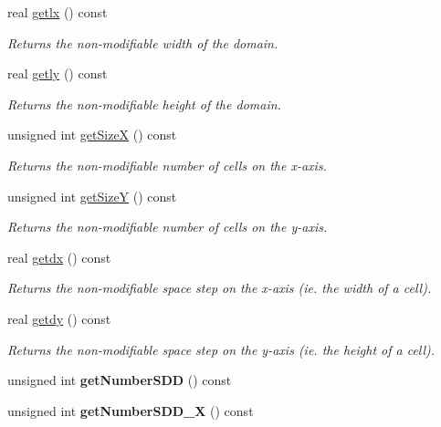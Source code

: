 \begin{DoxyCompactItemize}
real \hyperlink{classDomain_a510afad91fe81eb2ccef203a980f4223}{getlx} () const
\begin{DoxyCompactList}\small\item\em Returns the non-\/modifiable width of the domain. \end{DoxyCompactList}\item 
real \hyperlink{classDomain_ac9cedab179bb0611fc0e9fcfbcedb835}{getly} () const
\begin{DoxyCompactList}\small\item\em Returns the non-\/modifiable height of the domain. \end{DoxyCompactList}\item 
unsigned int \hyperlink{classDomain_a75f299e3871fe9cec01637b140429ef9}{get\+SizeX} () const
\begin{DoxyCompactList}\small\item\em Returns the non-\/modifiable number of cells on the x-\/axis. \end{DoxyCompactList}\item 
unsigned int \hyperlink{classDomain_a66692b4f23353c9b1fe884e583770cb3}{get\+SizeY} () const
\begin{DoxyCompactList}\small\item\em Returns the non-\/modifiable number of cells on the y-\/axis. \end{DoxyCompactList}\item 
real \hyperlink{classDomain_acdb586f6ef994a1621680ec9b946aeb4}{getdx} () const
\begin{DoxyCompactList}\small\item\em Returns the non-\/modifiable space step on the x-\/axis (ie. the width of a cell). \end{DoxyCompactList}\item 
real \hyperlink{classDomain_a5e62ab8a8b53f67cc3c30b6066b10aac}{getdy} () const
\begin{DoxyCompactList}\small\item\em Returns the non-\/modifiable space step on the y-\/axis (ie. the height of a cell). \end{DoxyCompactList}\item 
\mbox{\label{classDomain_a978917d5bf263dd1345f1a41c9edf661}} 
unsigned int {\bfseries get\+Number\+S\+DD} () const
\item 
\mbox{\label{classDomain_a02cc51cc2e5d976810039e7118382cde}} 
unsigned int {\bfseries get\+Number\+S\+D\+D\+\_\+X} () const

\end{DoxyCompactItemize}
